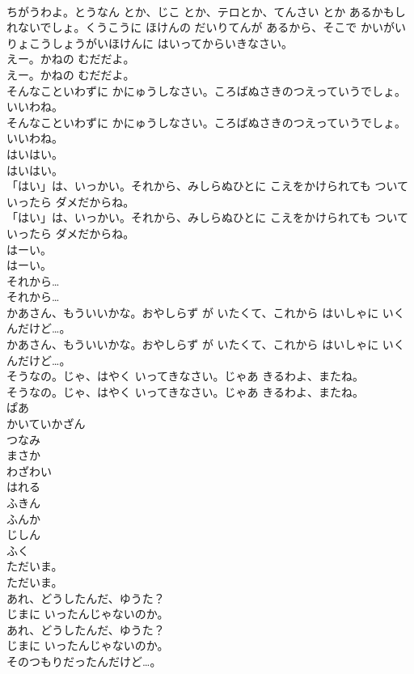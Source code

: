 \documentclass[8pt]{extreport}
\begin{document}
\begin{CJK}{UTF8}{min}
\\	ちがうわよ。とうなん とか、じこ とか、テロとか、てんさい とか あるかもしれないでしょ。くうこうに ほけんの だいりてんが あるから、そこで かいがいりょこうしょうがいほけんに はいってからいきなさい。
\\	えー。かねの むだだよ。
\\	えー。かねの むだだよ。
\\	そんなこといわずに かにゅうしなさい。ころばぬさきのつえっていうでしょ。いいわね。
\\	そんなこといわずに かにゅうしなさい。ころばぬさきのつえっていうでしょ。いいわね。
\\	はいはい。
\\	はいはい。
\\	「はい」は、いっかい。それから、みしらぬひとに こえをかけられても ついていったら ダメだからね。
\\	「はい」は、いっかい。それから、みしらぬひとに こえをかけられても ついていったら ダメだからね。
\\	はーい。
\\	はーい。
\\	それから…
\\	それから…
\\	かあさん、もういいかな。おやしらず が いたくて、これから はいしゃに いくんだけど…。
\\	かあさん、もういいかな。おやしらず が いたくて、これから はいしゃに いくんだけど…。
\\	そうなの。じゃ、はやく いってきなさい。じゃあ きるわよ、またね。
\\	そうなの。じゃ、はやく いってきなさい。じゃあ きるわよ、またね。
\\	ぱあ
\\	かいていかざん
\\	つなみ
\\	まさか
\\	わざわい
\\	はれる
\\	ふきん
\\	ふんか
\\	じしん
\\	ふく
\\	ただいま。
\\	ただいま。
\\	あれ、どうしたんだ、ゆうた？
\\	じまに いったんじゃないのか。
\\	あれ、どうしたんだ、ゆうた？
\\	じまに いったんじゃないのか。
\\	そのつもりだったんだけど…。

\end{CJK}
\end{document}
